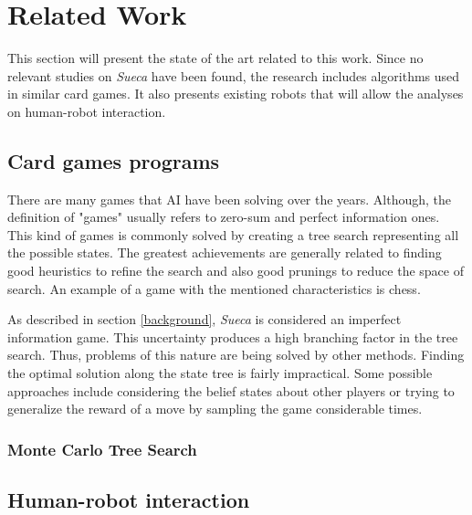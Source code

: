 \section{Related Work} \label{relatedwork}

This section will present the state of the art related to this work. Since no relevant studies on \emph{Sueca} have been found, the research includes algorithms used in similar card games. It also presents existing robots that will allow the analyses on human-robot interaction.


\subsection{Card games programs}
 
There are many games that AI have been solving over the years. Although, the definition of "games" usually refers to zero-sum and perfect information ones. This kind of games is commonly solved by creating a tree search representing all the possible states. The greatest achievements are generally related to finding good heuristics to refine the search and also good prunings to reduce the space of search. An example of a game with the mentioned characteristics is chess.

As described in section \ref{background}, \emph{Sueca} is considered an imperfect information game. This uncertainty produces a high branching factor in the tree search. Thus, problems of this nature are being solved by other methods. Finding the optimal solution along the state tree is fairly impractical. Some possible approaches include considering the belief states about other players or trying to generalize the reward of a move by sampling the game considerable times.


\subsubsection{Monte Carlo Tree Search}




\subsection{Human-robot interaction}